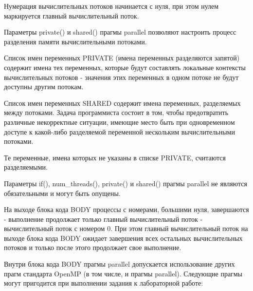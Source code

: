 Нумерация вычислительных потоков начинается с нуля, при этом нулем маркируется главный вычислительный поток.

Параметры private() и shared() прагмы parallel позволяют настроить процесс разделения памяти вычислительными потоками.

Список имен переменных PRIVATE (имена переменных разделяются запятой) содержит имена тех переменных, которые будут составлять локальные контексты вычислительных потоков - значения этих переменных в одном потоке не будут доступны другим потокам.

Список имен переменных SHARED содержит имена переменных, разделяемых между потоками. Задача программиста состоит в том, чтобы предотвратить различные некорректные ситуации, имеющие место быть при одновременном доступе к какой-либо разделяемой переменной нескольким вычислительными потоками.

Те переменные, имена которых не указаны в списке PRIVATE, считаются разделяемыми.

Параметры if(), num\_threads(), private() и shared() прагмы parallel не являются обязательными и могут быть опущены.

На выходе блока кода BODY процессы с номерами, большими нуля, завершаются - выполнение продолжает только главный вычислительный поток - вычислительный поток с номером 0. При этом главный вычислительный поток на выходе блока кода BODY ожидает завершения всех остальных вычислительных потоков и только после этого продолжает свое выполнение.

Внутри блока кода BODY прагмы parallel допускается использование других прагм стандарта OpenMP (в том числе, и прагмы parallel). Следующие прагмы могут пригодится при выполнении задания к лабораторной работе:

